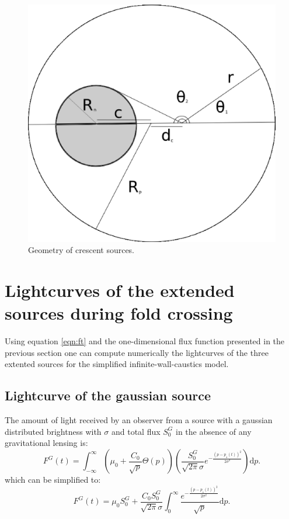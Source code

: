 \begin{figure}
\includegraphics[width = .49\textwidth]{plots/figure_rhalf.eps}
\caption{\label{fig:geom_crescent} Geometry of crescent sources.}
\end{figure}





\section{Lightcurves of the extended sources during fold crossing}

Using equation \ref{eqn:ft} and the one-dimensional flux function presented in the previous section one can compute numerically the lightcurves of the three extented sources for the simplified 
infinite-wall-caustics model.

\subsection{Lightcurve of the gaussian source}

The amount of light received by an observer from a source with a gaussian distributed brightness with $\sigma$ and total flux $S_0^G$ in the absence of any gravitational lensing is:
\begin{equation}
 F^G(t) = \int_{-\infty}^\infty  \left( \mu_0 + \frac{C_0}{\sqrt{p}} \Theta \left( p \right) \right) \left( \frac{S_0^G}{\sqrt{2 \pi} \sigma} e^{-\frac{(p-p_s(t))^2}{2 \sigma^2}} \right) \mathrm{d}p.
\end{equation}
which can be simplified to:
\begin{equation}
 F^G(t) = \mu_0 S_0^G + \frac{C_0 S_0^G}{\sqrt{2\pi} \sigma} \int_{0}^\infty \frac{e^{-\frac{(p-p_s(t))^2}{2 \sigma^2}}}{\sqrt{p}} \mathrm{d}p.
\end{equation}

